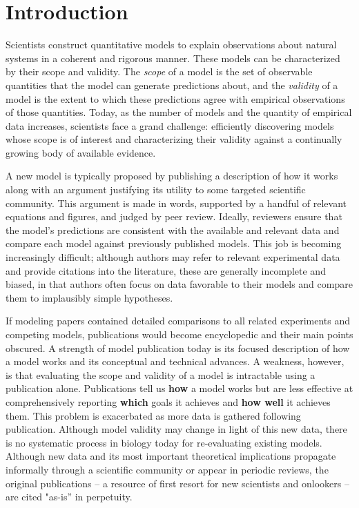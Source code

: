 \documentclass[11pt,letterpaper]{article}
\begin{document}
\section{Introduction}
Scientists construct quantitative models to explain observations about natural systems in a coherent and rigorous manner. These models can be characterized by their scope and validity. The \textit{scope} of a model is the set of observable quantities that the model can generate predictions about, and the \textit{validity} of a model is the extent to which these predictions agree with empirical observations of those quantities. Today, as the number of models and the quantity of empirical data increases, scientists face a grand challenge: efficiently discovering models whose scope is of interest and characterizing their validity against a continually growing body of available evidence. 

A new model is typically proposed by publishing a description of how it works along with an argument justifying its utility to some targeted scientific community. This argument is made in words, supported by a handful of relevant equations and figures, and judged by peer review. Ideally, reviewers ensure that the model's predictions are consistent with the available and relevant data and compare each model against previously published models. This job is becoming increasingly difficult; although authors may refer to relevant experimental data and provide citations into the literature, these are generally incomplete and biased, in that authors often focus on data favorable to their models and compare them to implausibly simple hypotheses.

If modeling papers contained detailed comparisons to all related experiments and competing models, publications would become encyclopedic and their main points obscured. A strength of model publication today is its focused description of how a model works and its conceptual and technical advances. A weakness, however, is that evaluating the scope and validity of a model is intractable using a publication alone. Publications tell us \textbf{how} a model works but are less effective at comprehensively reporting \textbf{which} goals it achieves and \textbf{how well} it achieves them. This problem is exacerbated as more data is gathered following publication. Although model validity may change in light of this new data, there is no systematic process in biology today for re-evaluating existing models. Although new data and its most important theoretical implications propagate informally through a scientific community or appear in periodic reviews, the original publications -- a resource of first resort for new scientists and onlookers -- are cited "as-is'' in perpetuity. 	
\end{document}
